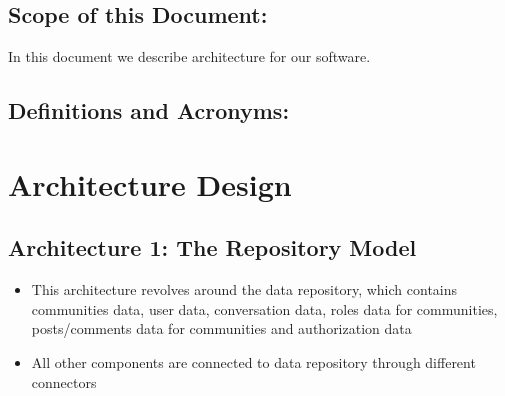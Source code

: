 \documentclass[11pt]{article}
\begin{document}
\begin{itemize}
\subsection{Scope of this Document:}
In this document we describe architecture for our software.
\subsection{Definitions and Acronyms:}


\section{ Architecture Design}

\subsection{Architecture 1: The Repository Model}

\begin{itemize}
    \item This architecture revolves around the data repository, which contains communities data, user data, conversation data, roles data for communities, posts/comments data for communities and authorization data
    \item All other components are connected to data repository through different connectors
\end{itemize}



\begin{table}[H]
    \centering
    

\end{table}
\end{itemize}
\end{document}
